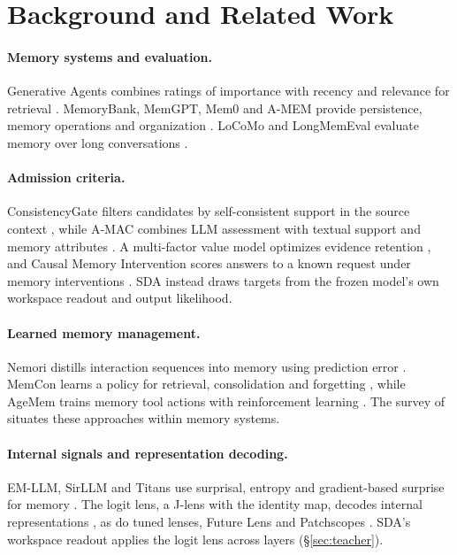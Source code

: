 \section{Background and Related Work}
\label{sec:related}

\paragraph{Memory systems and evaluation.}
Generative Agents combines ratings of importance with recency and
relevance for retrieval \citep{park2023generative}. MemoryBank, MemGPT,
Mem0 and A-MEM provide persistence, memory operations and organization
\citep{zhong2023memorybank,packer2023memgpt,mem0,amem2025}.
LoCoMo and LongMemEval evaluate memory over long conversations
\citep{maharana2024locomo,wu2025longmemeval}.

\paragraph{Admission criteria.}
ConsistencyGate filters candidates by self-consistent support in the
source context \citep{consistencygate2026}, while A-MAC combines LLM
assessment with textual support and memory attributes \citep{amac2026}.
A multi-factor value model optimizes evidence retention
\citep{valuemodel2026}, and Causal Memory Intervention scores answers to
a known request under memory interventions \citep{cmi2026}. SDA instead
draws targets from the frozen model's own workspace readout and output
likelihood.

\paragraph{Learned memory management.}
Nemori distills interaction sequences into memory using prediction error
\citep{nemori2026}. MemCon learns a policy for retrieval, consolidation
and forgetting \citep{memcon2026}, while AgeMem trains memory tool
actions with reinforcement learning \citep{agemem2026}. The survey of
\citet{hu2025memorysurvey} situates these approaches within memory
systems.

\paragraph{Internal signals and representation decoding.}
EM-LLM, SirLLM and Titans use surprisal, entropy and gradient-based
surprise for memory
\citep{fostiropoulos2024emllm,yao2024sirllm,behrouz2025titans}.
The logit lens, a J-lens with the identity map, decodes internal
representations
\citep{nostalgebraist2020logitlens,anthropic2026workspace}, as do tuned
lenses, Future Lens and Patchscopes
\citep{belrose2023tuned,pal2023futurelens,ghandeharioun2024patchscopes}.
SDA's workspace readout applies the logit lens across layers
(\S\ref{sec:teacher}).

